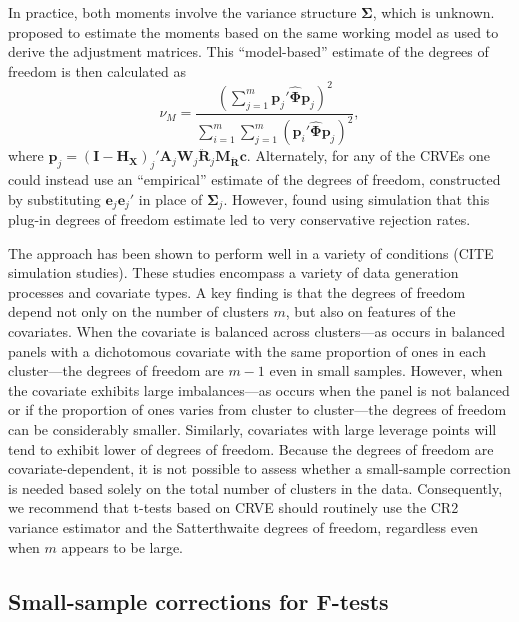 \documentclass[12pt]{article}\usepackage[]{graphicx}\usepackage[]{color}
\newcommand{\bm}{\mathbf}
\newcommand{\bs}{\boldsymbol}
\begin{document}
In practice, both moments involve the variance structure $\bs\Sigma$, which is unknown. 
\citet{Bell2002bias} proposed to estimate the moments based on the same working model as used to derive the adjustment matrices. 
This ``model-based'' estimate of the degrees of freedom is then calculated as 
\begin{equation}
\nu_{M} = \frac{\left(\sum_{j=1}^m \bm{p}_j' \hat{\bs\Phi} \bm{p}_j\right)^2}{\sum_{i=1}^m \sum_{j=1}^m \left(\bm{p}_i' \hat{\bs\Phi} \bm{p}_j\right)^2},
\end{equation}
where $\bm{p}_j = \left(\bm{I} - \bm{H_X}\right)_j'\bm{A}_j \bm{W}_j\bm{\ddot{R}}_j\bm{M_{\ddot{R}}} \bm{c}$.\todo{Can we use $\bm{H_{\ddot{U}}}$ here instead?} 
Alternately, for any of the CRVEs one could instead use an ``empirical'' estimate of the degrees of freedom, constructed by substituting $\bm{e}_j \bm{e}_j'$ in place of $\bs\Sigma_j$. 
However, \citet{Bell2002bias} found using simulation that this plug-in degrees of freedom estimate led to very conservative rejection rates. 

The \citet{Bell2002bias} approach has been shown to perform well in a variety of conditions (CITE simulation studies). 
These studies encompass a variety of data generation processes and covariate types. 
A key finding is that the degrees of freedom depend not only on the number of clusters $m$, but also on features of the covariates. 
When the covariate is balanced across clusters---as occurs in balanced panels with a dichotomous covariate with the same proportion of ones in each cluster---the degrees of freedom are $m - 1$ even in small samples. 
However, when the covariate exhibits large imbalances---as occurs when the panel is not balanced or if the proportion of ones varies from cluster to cluster---the degrees of freedom can be considerably smaller. 
Similarly, covariates with large leverage points will tend to exhibit lower of degrees of freedom. 
Because the degrees of freedom are covariate-dependent, it is not possible to assess whether a small-sample correction is needed based solely on the total number of clusters in the data. 
Consequently, we recommend that t-tests based on CRVE should routinely use the CR2 variance estimator and the Satterthwaite degrees of freedom, regardless even when $m$ appears to be large.

\subsection{Small-sample corrections for F-tests}
\end{document}
